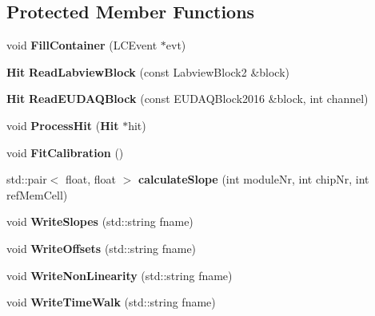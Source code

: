 \subsection*{Protected Member Functions}
\begin{DoxyCompactItemize}
\item 
void {\bfseries Fill\-Container} (L\-C\-Event $\ast$evt)\label{classCALICE_1_1Ahc2TimeCalibrator_a8f4d7a95735401fbc9f2743fc0c3ac8e}

\item 
{\bf Hit} {\bfseries Read\-Labview\-Block} (const Labview\-Block2 \&block)\label{classCALICE_1_1Ahc2TimeCalibrator_a2039365be1b6ce5fdb18a9daaec4d5f8}

\item 
{\bf Hit} {\bfseries Read\-E\-U\-D\-A\-Q\-Block} (const E\-U\-D\-A\-Q\-Block2016 \&block, int channel)\label{classCALICE_1_1Ahc2TimeCalibrator_a5f2d63f6a2d905854f342adcd97c085d}

\item 
void {\bfseries Process\-Hit} ({\bf Hit} $\ast$hit)\label{classCALICE_1_1Ahc2TimeCalibrator_a9498da3d788f62db60161e3007341163}

\item 
void {\bfseries Fit\-Calibration} ()\label{classCALICE_1_1Ahc2TimeCalibrator_a02b4d7022243d6027d9e39657bdb2935}

\item 
std\-::pair$<$ float, float $>$ {\bfseries calculate\-Slope} (int module\-Nr, int chip\-Nr, int ref\-Mem\-Cell)\label{classCALICE_1_1Ahc2TimeCalibrator_a2a4c34a90bef00000a74b804e82b45ea}

\item 
void {\bfseries Write\-Slopes} (std\-::string fname)\label{classCALICE_1_1Ahc2TimeCalibrator_ab930ac5be7053794d7f2df6bfe680614}

\item 
void {\bfseries Write\-Offsets} (std\-::string fname)\label{classCALICE_1_1Ahc2TimeCalibrator_ac1f9ee17b56d41367cba2a742c6d395e}

\item 
void {\bfseries Write\-Non\-Linearity} (std\-::string fname)\label{classCALICE_1_1Ahc2TimeCalibrator_a744f1b022a5165b0ff981854a15a0fa8}

\item 
void {\bfseries Write\-Time\-Walk} (std\-::string fname)\label{classCALICE_1_1Ahc2TimeCalibrator_a70a98f2549e828f4ef7296d16832312d}

\end{DoxyCompactItemize}
